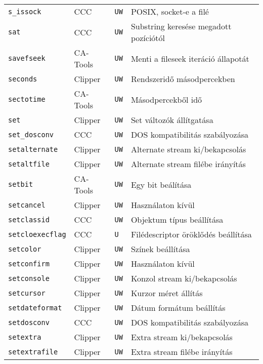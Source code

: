 \begin{tabular}{|l|l|l|l|}
\verb!s_issock!                    & CCC      &  {\tt UW} & POSIX, socket-e a filé\\
\verb!sat!                         & CCC      &  {\tt UW} & Substring keresése megadott pozíciótól\\
\verb!savefseek!                   & CA-Tools &  {\tt UW} & Menti a fileseek iteráció állapotát\\
\verb!seconds!                     & Clipper  &  {\tt UW} & Rendszeridő másodpercekben\\
\verb!sectotime!                   & CA-Tools &  {\tt UW} & Másodpercekből idő\\
\verb!set!                         & Clipper  &  {\tt UW} & Set változók állítgatása\\
\verb!set_dosconv!                 & CCC      &  {\tt UW} & DOS kompatibilitás szabályozása\\
\verb!setalternate!                & Clipper  &  {\tt UW} & Alternate stream ki/bekapcsolás\\
\verb!setaltfile!                  & Clipper  &  {\tt UW} & Alternate stream filébe irányítás\\
\verb!setbit!                      & CA-Tools &  {\tt UW} & Egy bit beálítása\\
\verb!setcancel!                   & Clipper  &  {\tt UW} & Használaton kívül\\
\verb!setclassid!                  & CCC      &  {\tt UW} & Objektum típus beállítása\\
\verb!setcloexecflag!              & CCC      &  {\tt U~} & Filédescriptor öröklődés beállítása\\
\verb!setcolor!                    & Clipper  &  {\tt UW} & Színek beállítása\\
\verb!setconfirm!                  & Clipper  &  {\tt UW} & Használaton kívül\\
\verb!setconsole!                  & Clipper  &  {\tt UW} & Konzol stream ki/bekapcsolás\\ 
\verb!setcursor!                   & Clipper  &  {\tt UW} & Kurzor méret állítás\\
\verb!setdateformat!               & Clipper  &  {\tt UW} & Dátum formátum beállítás\\
\verb!setdosconv!                  & CCC      &  {\tt UW} & DOS kompatibilitás szabályozása\\
\verb!setextra!                    & Clipper  &  {\tt UW} & Extra stream ki/bekapcsolás\\
\verb!setextrafile!                & Clipper  &  {\tt UW} & Extra stream filébe irányítás\\

\end{tabular}
